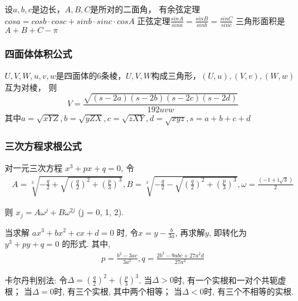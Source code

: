 \documentclass[landscape,a4paper]{article}
\begin{document}
\begin{spacing}{0.3}
\begin{multicols}{2}
设$a, b, c$是边长，$A, B, C$是所对的二面角，
有余弦定理$cos a = cos b \cdot cos c + sin b \cdot sin c \cdot cos A$
正弦定理$\frac{sin A}{sin a} = \frac{sin B}{sin b} = \frac{sin C}{sin c}$
三角形面积是$A + B + C - \pi$

\subsubsection{四面体体积公式}

$U, V, W, u, v, w$是四面体的$6$条棱，$U, V, W$构成三角形，$(U, u), (V, v), (W, w)$ 互为对棱，
则$$V = \frac{\sqrt{(s - 2a)(s - 2b)(s - 2c)(s - 2d)}}{192 uvw}$$
其中$
        a  =  \sqrt{xYZ},
        b  =  \sqrt{yZX},
        c  =  \sqrt{zXY},
        d  =  \sqrt{xyz},
        s  =  a + b + c + d
    $

\subsubsection{三次方程求根公式}
对一元三次方程
$x ^ 3 + px + q = 0$,
令
\begin{align*}
  A = \sqrt[3]{-\frac{q}{2}+\sqrt{(\frac{q}{2})^2+(\frac{p}{3})^3}},
  B = \sqrt[3]{-\frac{q}{2}-\sqrt{(\frac{q}{2})^2+(\frac{p}{3})^3}},
  \omega = \frac{(-1 + \mathrm{i} \sqrt{3})}{2}
\end{align*}

则 $x_j = A\omega^{j} + B\omega^{2j}$ (j = 0, 1, 2).

当求解 $ax ^ 3 + bx ^ 2 + cx + d = 0$ 时, 令$x = y - \frac{b}{3a}$, 再求解$y$, 即转化为$y^3 + py + q = 0$ 的形式.
其中,
\begin{align*}
  p = \frac{b^2 - 3ac}{3a^2},
  q = \frac{2b ^ 3 - 9 abc + 27 a ^ 2 d}{27 a ^ 3}
\end{align*}

卡尔丹判别法:
令$\Delta = (\frac{q}{2}) ^ 2 + (\frac{p}{3}) ^ 3$.
当$\Delta > 0$时, 有一个实根和一对个共轭虚根；
当$\Delta = 0$时, 有三个实根, 其中两个相等；
当$\Delta < 0$时, 有三个不相等的实根.


\end{multicols}
\end{spacing}
\end{document}
